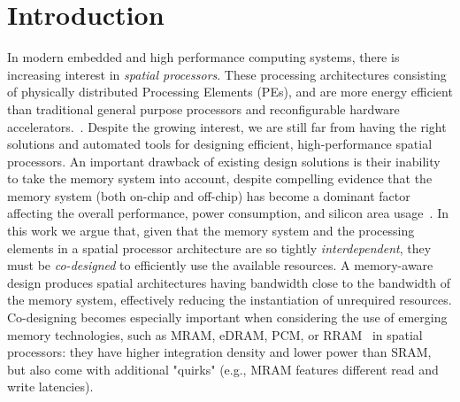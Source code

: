 \section{Introduction}
In modern embedded and high performance computing systems, there is increasing interest in \textit{spatial processors}. These processing architectures consisting of physically distributed Processing Elements (PEs), and are more energy efficient than traditional general purpose processors and reconfigurable hardware accelerators.~\cite{parashar2014efficient,prabhakar2017plasticine,budiu2004spatial,streamproc2019,cerqueira2020catena,7284058,8686088}. %
Despite the growing interest, we are still far from having the right  solutions and automated tools for designing efficient, high-performance spatial processors. An important drawback of existing design solutions is their inability to take the memory system into account, despite compelling evidence that the memory system (both on-chip and off-chip) has become a dominant factor affecting the overall performance, power consumption, and silicon area usage~\cite{williams2009roofline,dayarathna2015data,oh2009analytical}.
In this work we argue that, given that the memory system and the processing elements in a spatial processor architecture are so tightly \textit{interdependent}, they must be \textit{co-designed} to efficiently use the available resources. A memory-aware design produces spatial architectures having bandwidth close to the bandwidth of the memory system, effectively reducing the instantiation of unrequired resources. Co-designing becomes especially important when considering the use of emerging memory technologies, such as MRAM, eDRAM, PCM, or RRAM~\cite{mem2016} in spatial processors: they have higher integration density and lower power than SRAM, but also come with additional "quirks" (e.g., MRAM features different read and write latencies).

%

